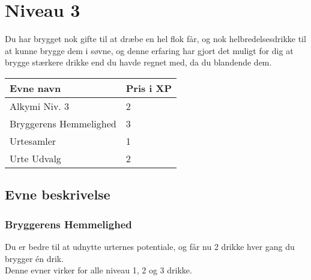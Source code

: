 \chapter*{Niveau 3}
Du har brygget nok gifte til at dræbe en hel flok får, og nok helbredelsesdrikke til at kunne brygge dem i søvne, og denne erfaring har gjort det muligt for dig at brygge stærkere drikke end du havde regnet med, da du blandende dem.

\begin{table}[H]
    \centering
    \begin{tabular}{|p{}|p{}|}
    \rowcolor{cerulean!80}\hline
        Evne navn & Pris i XP \\\hline
        Alkymi Niv. 3 & 2\\\hline
        Bryggerens Hemmelighed & 3\\\hline
        Urtesamler & 1 \\\hline
        Urte Udvalg & 2\\
         \hline
    \end{tabular}
\end{table}
\section*{Evne beskrivelse}




\subsection*{Bryggerens Hemmelighed}
Du er bedre til at udnytte urternes potentiale, og får nu 2 drikke hver gang du brygger én drik.\\
Denne evner virker for alle niveau 1, 2 og 3 drikke.\\



